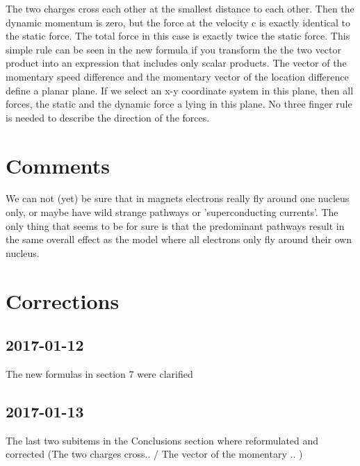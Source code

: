 \documentclass[12pt,a4paper,twocolumn]{article}
\begin{document}
\begin{itemize}
  \subitem The two charges cross each other at the smallest distance to each other. Then the dynamic momentum is zero, but the force at the velocity c is exactly identical to the static force. The total force in this case is exactly twice the static force. This simple rule can be seen in the new formula if you transform the the two vector product into an expression that includes only scalar products.
  \subitem The vector of the momentary speed difference and the momentary vector of the location difference define a planar plane. If we select an x-y coordinate system in this plane, then all forces, the static and the dynamic force a lying in this plane. No three finger rule is needed to describe the direction of the forces.
\end{itemize}

\section{Comments}
We can not (yet) be sure that in magnets electrons really fly around one nucleus only, or maybe have wild strange pathways or 'superconducting currents'. The only thing that seems to be for sure is that the predominant pathways result in the same overall effect as the model where all electrons only fly around their own nucleus.

\section{Corrections}
\subsection{2017-01-12}
The new formulas in section 7 were clarified 
\subsection{2017-01-13}
The last two subitems in the Conclusions section where reformulated and corrected (The two charges cross.. / The vector of the momentary .. )
\end{document}
